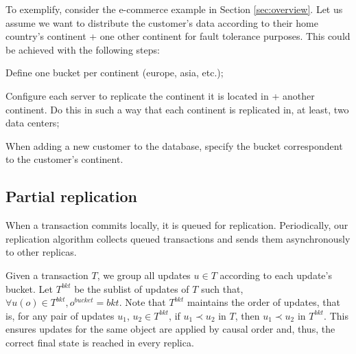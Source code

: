 \documentclass{vldb}
\begin{document}
To exemplify, consider the e-commerce example in Section \ref{sec:overview}.
Let us assume we want to distribute the customer's data according to their home country's continent + one other continent for fault tolerance purposes.
This could be achieved with the following steps:

\begin{compactenum}
	\item Define one bucket per continent (europe, asia, etc.);
	\item Configure each server to replicate the continent it is located in + another continent. Do this in such a way that each continent is replicated in, at least, two data centers;
	\item When adding a new customer to the database, specify the bucket correspondent to the customer's continent.
\end{compactenum}

\subsection{Partial replication}
\label{subsec:partial}


When a transaction commits locally, it is queued for replication.
Periodically, our replication algorithm collects queued transactions and sends them asynchronously to other replicas.

Given a transaction $T$, we group all updates $u \in T$ according to each update's bucket.
Let $T^{bkt}$ be the sublist of updates of $T$ such that, $\forall u(o) \in T^{bkt}, o^{bucket} = bkt$.
Note that $T^{bkt}$ maintains the order of updates, that is, for any pair of updates $u_1$, $u_2 \in T^{bkt}$, if $u_1 \prec u_2$ in $T$, then $u_1 \prec u_2$ in $T^{bkt}$.
This ensures updates for the same object are applied by causal order and, thus, the correct final state is reached in every replica.
\end{document}
